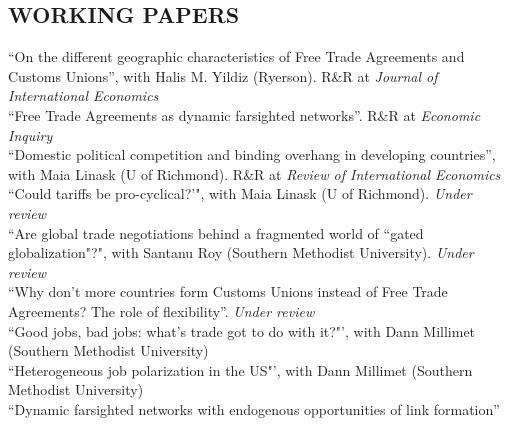 \documentclass[11pt]{res}
\begin{document}
\begin{resume}
\section{WORKING PAPERS}\vspace{1.5mm}
{``On the different geographic characteristics of Free Trade Agreements and Customs Unions''}, with Halis M. Yildiz (Ryerson). R\&R at \emph{Journal of International Economics}\vspace{1.5mm}\\
{ ``Free Trade Agreements as dynamic farsighted networks''}. R\&R at \emph{Economic Inquiry} \vspace{1.5mm}\\
{``Domestic political competition and binding overhang in developing countries''}, with Maia Linask (U of Richmond). R\&R at \emph{Review of International Economics}\vspace{1.5mm}\\
{``Could tariffs be pro-cyclical?'"}, with Maia Linask (U of Richmond). \emph{Under review}\vspace{1.5mm}\\


\phantom{.}\vspace{.05cm}
{``Are global trade negotiations behind a fragmented world of ``gated globalization"?"}, with Santanu Roy (Southern Methodist University). \emph{Under review}\vspace{1.5mm}\\
{``Why don't more countries form Customs Unions instead of Free Trade Agreements? The role of flexibility''}.\emph{ Under review} \vspace{1.5mm}\\
{``Good jobs, bad jobs: what's trade got to do with it?"'}, with Dann Millimet (Southern Methodist University)\vspace{1.5mm}\\
{``Heterogeneous job polarization in the US"'}, with Dann Millimet (Southern Methodist University)\vspace{1.5mm}\\
{ ``Dynamic farsighted networks with endogenous opportunities of link formation''} \vspace{1.5mm}\\


\end{resume}
\end{document}
